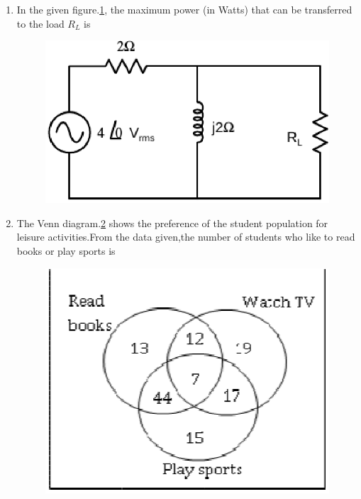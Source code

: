 \documentclass[journal,12pt,twocolumn]{IEEEtran}
\begin{document}
\begin{enumerate}
\item In the given figure.\ref{fig104}, the maximum power (in Watts) that can be transferred to the load $R_{L}$ is
\begin{figure}[!h]
\begin{center}
\includegraphics[scale=0.4]{./figs/fig104.eps}
\caption{}
\label{fig104}
\end{center}
\end{figure}

 
\item The Venn diagram.\ref{fig105} shows the preference of the student population for leisure activities.From the data given,the number of students who like to read books or play sports is
\begin{enumerate}
\setlength\itemsep{2em}
\begin{figure}[!h]
\begin{center}
\includegraphics[scale=0.5]{./figs/fig105.eps}
\caption{}
\label{fig105}
\end{center}
\end{figure}
\end{enumerate}


\end{enumerate}
\end{document}
